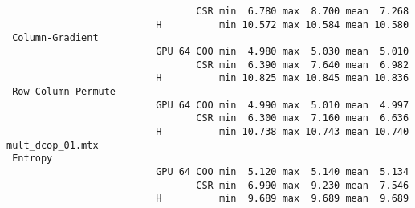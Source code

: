 {\begin{verbatim}
                                 CSR min  6.780 max  8.700 mean  7.268
                          H          min 10.572 max 10.584 mean 10.580
 Column-Gradient
                          GPU 64 COO min  4.980 max  5.030 mean  5.010
                                 CSR min  6.390 max  7.640 mean  6.982
                          H          min 10.825 max 10.845 mean 10.836
 Row-Column-Permute
                          GPU 64 COO min  4.990 max  5.010 mean  4.997
                                 CSR min  6.300 max  7.160 mean  6.636
                          H          min 10.738 max 10.743 mean 10.740
mult_dcop_01.mtx
 Entropy
                          GPU 64 COO min  5.120 max  5.140 mean  5.134
                                 CSR min  6.990 max  9.230 mean  7.546
                          H          min  9.689 max  9.689 mean  9.689
\end{verbatim}
}
